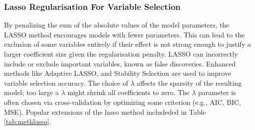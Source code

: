 





\subsubsection{Lasso Regularisation For Variable Selection }
\noindent By penalizing the sum of the absolute values of the model parameters, the LASSO method encourages models with fewer parameters. This can lead to the exclusion of some variables entirely if their effect is not strong enough to justify a larger coefficient size given the regularisation penalty. LASSO can incorrectly include or exclude important variables, known as false discoveries. Enhanced methods like Adaptive LASSO, and Stability Selection are used to improve variable selection accuracy. The choice of \(\lambda\) affects the sparsity of the resulting model; too large a \(\lambda\) might shrink all coefficients to zero. The \(\lambda\) parameter is often chosen via cross-validation by optimizing some criterion (e.g., AIC, BIC, MSE). \parencite{freijeirogonzalez_critical_2022} Popular extensions of the lasso method includeded in Table \ref{tab:methlasso}.

